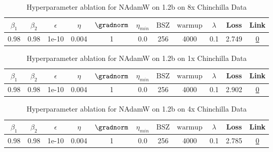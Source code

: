 \begin{table}[H]
\centering
\caption{Hyperparameter ablation for NAdamW on 1.2b on 8x Chinchilla Data}
\label{tab:ablation_nadamw_1.2b_8}
\begin{tabular}{ccccccccccc}
\toprule
$\beta_1$ & $\beta_2$ & $\epsilon$ & $\eta$ & $\gradnorm$ & $\eta_{min}$ & $\mathrm{BSZ}$ & $\mathrm{warmup}$ & $\lambda$ & Loss & Link \\
\midrule
0.98 & 0.98 & 1e-10 & 0.004 & 1 & 0.0 & 256 & 4000 & 0.1 & 2.749 & \href{https://wandb.ai/stanford-mercury/optimizer-scaling/runs/sweep-1.2b-193B-nadamwa486b9lr0.004-wd0.1-minlr0.0-warmup4000-b1-563e6e}{0} \\
\midrule
\bottomrule
\end{tabular}
\end{table}

\begin{table}[H]
\centering
\caption{Hyperparameter ablation for NAdamW on 1.2b on 1x Chinchilla Data}
\label{tab:ablation_nadamw_1.2b_1}
\begin{tabular}{ccccccccccc}
\toprule
$\beta_1$ & $\beta_2$ & $\epsilon$ & $\eta$ & $\gradnorm$ & $\eta_{min}$ & $\mathrm{BSZ}$ & $\mathrm{warmup}$ & $\lambda$ & Loss & Link \\
\midrule
0.98 & 0.98 & 1e-10 & 0.004 & 1 & 0.0 & 256 & 4000 & 0.1 & 2.902 & \href{https://wandb.ai/stanford-mercury/optimizer-scaling/runs/sweep-1.2b-24B-nadamwf62d1blr0.004-wd0.1-minlr0.0-warmup4000-b10-642070}{0} \\
\midrule
\bottomrule
\end{tabular}
\end{table}

\begin{table}[H]
\centering
\caption{Hyperparameter ablation for NAdamW on 1.2b on 4x Chinchilla Data}
\label{tab:ablation_nadamw_1.2b_4}
\begin{tabular}{ccccccccccc}
\toprule
$\beta_1$ & $\beta_2$ & $\epsilon$ & $\eta$ & $\gradnorm$ & $\eta_{min}$ & $\mathrm{BSZ}$ & $\mathrm{warmup}$ & $\lambda$ & Loss & Link \\
\midrule
0.98 & 0.98 & 1e-10 & 0.004 & 1 & 0.0 & 256 & 4000 & 0.1 & 2.785 & \href{https://wandb.ai/stanford-mercury/optimizer-scaling/runs/sweep-1.2b-96B-nadamw8e7088lr0.004-wd0.1-minlr0.0-warmup4000-b10-3c3e6a}{0} \\
\midrule
\bottomrule
\end{tabular}
\end{table}

